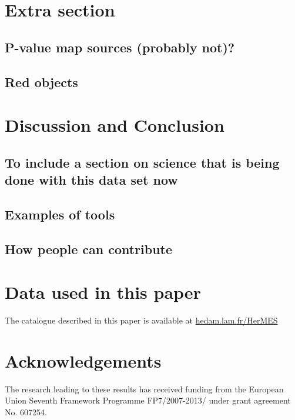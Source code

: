 \documentclass[usenatbib]{mnras}
\begin{document}
\section{Extra section}

\subsection{P-value map sources (probably not)?}
\subsection{Red objects}

\section{Discussion and Conclusion}

\subsection{To include a section on science that is being done with this data set now}


\subsection{Examples of tools}

\subsection{How people can contribute}



\section*{Data used in this paper}

The catalogue described in this paper is available at \url{hedam.lam.fr/HerMES}



\section*{Acknowledgements}


The research leading to these results has received funding from the European
Union Seventh Framework Programme FP7/2007-2013/ under grant agreement No.
607254.
\end{document}
